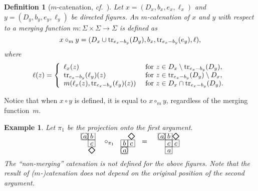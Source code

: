 \documentclass[final,nomarks]{dmtcs-episciences}
\newcommand{\dfimglabel}[3]{
    \put(#1,#2){
        \put(0,0){\line(1,0){10}}
        \put(0,0){\line(0,1){10}}
        \put(10,10){\line(-1,0){10}}
        \put(10,10){\line(0,-1){10}}
        \put(3,2){$#3$}
    }
}
\newcommand{\dfimgbegin}[2]{
    \put(#1,#2){
        \put(5,5){\circle{10}}
    }
}
\newcommand{\dfimgend}[2]{
    \put(#1,#2){
        \put(0,0){{\huge $\diamond$}}
    }
}
\newcommand{\dfimgbeginlabel}[3]{
    \dfimglabel{#1}{#2}{#3}
    \dfimgbegin{#1}{#2}
}
\newtheorem{definition}{Definition}
\newtheorem{example}{Example}
\begin{document}
\begin{definition}[$m$-catenation, \textit{cf.}~\cite{KolMoc}]
Let $x=(D_x,b_x,e_x,\ell_x)$ and $y=(D_y,b_y,e_y,\ell_y)$ be directed figures.
An \emph{$m$-catenation} of $x$ and $y$ with respect to a \emph{merging function}
$m:\Sigma\times\Sigma\to\Sigma$ is defined as
\begin{displaymath}
x\circ_m y=(D_x\cup\mathrm{tr}_{e_x-b_y}(D_y),b_x,\mathrm{tr}_{e_x-b_y}(e_y),\ell),
\end{displaymath}
where
\begin{displaymath}
\ell(z)=\left\{\begin{array}{ll}
\ell_x(z)  & \mbox{~for~} z\in D_x\setminus\mathrm{tr}_{e_x-b_y}(D_y),\\
\mathrm{tr}_{e_x-b_y}(\ell_y)(z)  & \mbox{~for~} z\in \mathrm{tr}_{e_x-b_y}(D_y)\setminus D_x,\\
m(\ell_x(z),\mathrm{tr}_{e_x-b_y}(\ell_y)(z)) & \mbox{~for~} z\in D_x\cap\mathrm{tr}_{e_x-b_y}(D_y).\\
\end{array}\right.
\end{displaymath}
\end{definition}


Notice that when $x\circ y$ is defined, it is equal to $x\circ_m y$, regardless
of the merging function~$m$.

\begin{example}
Let $\pi_1$ be the projection onto the first argument.
\begin{displaymath}
\begin{picture}(20,25)
    \dfimgbeginlabel{00}{20}{a}
    \dfimglabel{10}{20}{b}
    \dfimglabel{10}{10}{c}
    \dfimgend{10}{00}
\end{picture}~
\begin{picture}(30,25)
    \put(10,15){$\circ_{\pi_1}$}
\end{picture}~
\begin{picture}(20,25)
    \dfimgbeginlabel{00}{00}{a}
    \dfimglabel{00}{10}{b}
    \dfimglabel{10}{10}{c}
    \dfimgend{10}{20}
\end{picture}
\begin{picture}(30,25)
    \put(10,15){$=$}
\end{picture}~
\begin{picture}(30,25)
    \dfimgbeginlabel{00}{20}{a}
    \dfimglabel{10}{20}{b}
    \dfimglabel{10}{10}{c}
    \dfimglabel{10}{00}{a}
    \dfimglabel{20}{10}{c}
    \dfimgend{20}{20}
\end{picture}
\end{displaymath}
The ``non-merging'' catenation is not defined for the above figures. Note that the result 
of ($m$-)catenation does not depend on the original position of the second argument.
\end{example}
\end{document}
